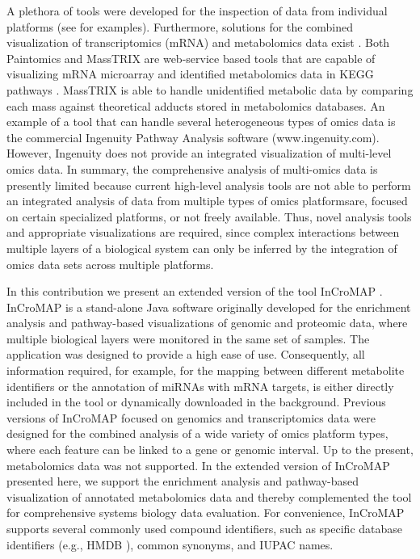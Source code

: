 \documentclass[final,5p,times,twocolumn]{elsarticle}
\begin{document}
A plethora of tools were developed for the inspection of data from individual platforms (see \cite{Gehlenborg2010} for examples). Furthermore, solutions for the combined visualization of transcriptomics (mRNA) and metabolomics data exist \cite{Garcia-Alcalde2011,Waegele2012}. Both Paintomics \cite{Garcia-Alcalde2011} and MassTRIX \cite{Waegele2012} are web-service based tools that are capable of visualizing mRNA microarray and identified metabolomics data in KEGG pathways \cite{Kanehisa2006}. MassTRIX is able to handle unidentified metabolic data by comparing each mass against theoretical adducts stored in metabolomics databases. An example of a tool that can handle several heterogeneous types of omics data is the commercial Ingenuity Pathway Analysis software (www.ingenuity.com). However, Ingenuity does not provide an integrated visualization of multi-level omics data. In summary, the comprehensive analysis of multi-omics data is presently limited because current high-level analysis tools are not able to perform an integrated analysis of data from multiple types of omics platformsare, focused on certain specialized platforms, or not freely available. Thus, novel analysis tools and appropriate visualizations are required, since complex interactions between multiple layers of a biological system can only be inferred by the integration of omics data sets across multiple platforms.

In this contribution we present an extended version of the tool InCroMAP \cite{Wrzodek2012a,Wrzodek2012b}. InCroMAP is a stand-alone Java software originally developed for the enrichment analysis and pathway-based visualizations of genomic and proteomic data, where multiple biological layers were monitored in the same set of samples. The application was designed to provide a high ease of use. Consequently, all information required, for example, for the mapping between different metabolite identifiers or the annotation of miRNAs with mRNA targets, is either directly included in the tool or dynamically downloaded in the background. Previous versions of InCroMAP focused on genomics and transcriptomics data were designed for the combined analysis of a wide variety of omics platform types, where each feature can be linked to a gene or genomic interval. Up to the present, metabolomics data was not supported. In the extended version of InCroMAP presented here, we support the enrichment analysis and pathway-based visualization of annotated metabolomics data and thereby complemented the tool for comprehensive systems biology data evaluation. For convenience, InCroMAP supports several commonly used compound identifiers, such as specific database identifiers (e.g., HMDB \cite{Wishart2009}), common synonyms, and IUPAC names. 
\end{document}
